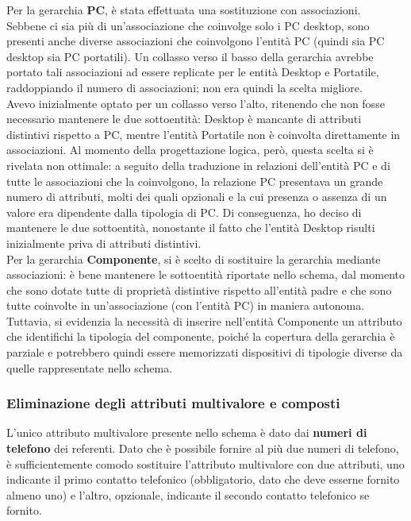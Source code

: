 \documentclass[a4paper,12pt]{report}
\begin{document}
Per la gerarchia \textbf{PC}, è stata effettuata una sostituzione con associazioni. \\
Sebbene ci sia più di un'associazione che coinvolge solo i PC desktop, sono presenti anche diverse associazioni che coinvolgono l'entità PC (quindi sia PC desktop sia PC portatili). Un collasso verso il basso della gerarchia avrebbe portato tali associazioni ad essere replicate per le entità Desktop e Portatile, raddoppiando il numero di associazioni; non era quindi la scelta migliore. \\
Avevo inizialmente optato per un collasso verso l'alto, ritenendo che non fosse necessario mantenere le due sottoentità: Desktop è mancante di attributi distintivi rispetto a PC, mentre l'entità Portatile non è coinvolta direttamente in associazioni. Al momento della progettazione logica, però, questa scelta si è rivelata non ottimale: a seguito della traduzione in relazioni dell'entità PC e di tutte le associazioni che la coinvolgono, la relazione PC presentava un grande numero di attributi, molti dei quali opzionali e la cui presenza o assenza di un valore era dipendente dalla tipologia di PC. Di conseguenza, ho deciso di mantenere le due sottoentità, nonostante il fatto che l'entità Desktop risulti inizialmente priva di attributi distintivi. \\

Per la gerarchia \textbf{Componente}, si è scelto di sostituire la gerarchia mediante associazioni: è bene mantenere le sottoentità riportate nello schema, dal momento che sono dotate tutte di proprietà distintive rispetto all'entità padre e che sono tutte coinvolte in un'associazione (con l'entità PC) in maniera autonoma. Tuttavia, si evidenzia la necessità di inserire nell'entità Componente un attributo che identifichi la tipologia del componente, poiché la copertura della gerarchia è parziale e potrebbero quindi essere memorizzati dispositivi di tipologie diverse da quelle rappresentate nello schema.

\subsubsection*{Eliminazione degli attributi multivalore e composti}

L'unico attributo multivalore presente nello schema è dato dai \textbf{numeri di telefono} dei referenti. Dato che è possibile fornire al più due numeri di telefono, è sufficientemente comodo sostituire l'attributo multivalore con due attributi, uno indicante il primo contatto telefonico (obbligatorio, dato che deve esserne fornito almeno uno) e l'altro, opzionale, indicante il secondo contatto telefonico se fornito. \\
\end{document}
